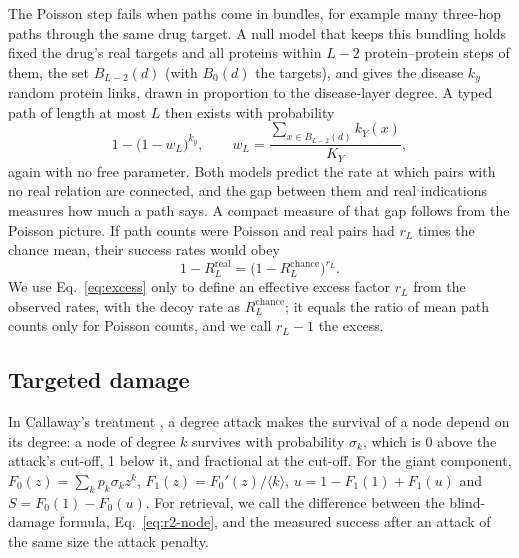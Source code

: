 The Poisson step fails when paths come in bundles, for example many three-hop
paths through the same drug target. A null model that keeps this bundling
holds fixed the drug's real targets and all proteins within $L-2$
protein--protein steps of them, the set $B_{L-2}(d)$ (with $B_0(d)$ the targets), and
gives the disease $k_y$ random protein links, drawn in proportion to the
disease-layer degree. A typed path of length at most $L$ then exists with
probability
\begin{equation}
1-\bigl(1-w_L\bigr)^{k_y},\qquad w_L=\frac{\sum_{x\in B_{L-2}(d)}k_Y(x)}{K_Y},
\label{eq:ball}
\end{equation}
again with no free parameter. Both models predict the rate at which pairs with
no real relation are connected, and the gap between them and real indications
measures how much a path says. A compact measure of that gap follows from the
Poisson picture. If path counts were Poisson and real pairs had $r_L$ times the
chance mean, their success rates would obey
\begin{equation}
1-R_L^{\mathrm{real}}=\bigl(1-R_L^{\mathrm{chance}}\bigr)^{r_L}.
\label{eq:excess}
\end{equation}
We use Eq.~\eqref{eq:excess} only to define an effective excess factor $r_L$
from the observed rates, with the decoy rate as $R_L^{\mathrm{chance}}$; it
equals the ratio of mean path counts only for Poisson counts, and we call
$r_L-1$ the excess.

\subsection{Targeted damage}
\label{sec:theory-mf}

In Callaway's treatment \cite{callaway2000network}, a degree attack makes the
survival of a node depend on its degree: a node of degree $k$ survives with
probability $\sigma_k$, which is 0 above the attack's cut-off, 1 below it, and
fractional at the cut-off. For the giant component,
$F_0(z)=\sum_k p_k\sigma_k z^k$, $F_1(z)=F_0'(z)/\langle k\rangle$,
$u=1-F_1(1)+F_1(u)$ and $S=F_0(1)-F_0(u)$. For retrieval, we call the
difference between the blind-damage formula, Eq.~\eqref{eq:r2-node}, and the
measured success after an attack of the same size the attack penalty.

